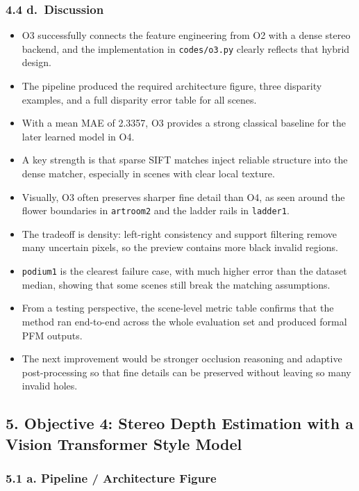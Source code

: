 \documentclass[
  11pt,
]{article}
\providecommand{\tightlist}{%
  \setlength{\itemsep}{0pt}\setlength{\parskip}{0pt}}
\begin{document}
\subsubsection{4.4 d.~Discussion}\label{d.-discussion-2}

\begin{itemize}
\tightlist
\item
  O3 successfully connects the feature engineering from O2 with a dense
  stereo backend, and the implementation in \texttt{codes/o3.py} clearly
  reflects that hybrid design.
\item
  The pipeline produced the required architecture figure, three
  disparity examples, and a full disparity error table for all scenes.
\item
  With a mean MAE of 2.3357, O3 provides a strong classical baseline for
  the later learned model in O4.
\item
  A key strength is that sparse SIFT matches inject reliable structure
  into the dense matcher, especially in scenes with clear local texture.
\item
  Visually, O3 often preserves sharper fine detail than O4, as seen
  around the flower boundaries in \texttt{artroom2} and the ladder rails
  in \texttt{ladder1}.
\item
  The tradeoff is density: left-right consistency and support filtering
  remove many uncertain pixels, so the preview contains more black
  invalid regions.
\item
  \texttt{podium1} is the clearest failure case, with much higher error
  than the dataset median, showing that some scenes still break the
  matching assumptions.
\item
  From a testing perspective, the scene-level metric table confirms that
  the method ran end-to-end across the whole evaluation set and produced
  formal PFM outputs.
\item
  The next improvement would be stronger occlusion reasoning and
  adaptive post-processing so that fine details can be preserved without
  leaving so many invalid holes.
\end{itemize}

\subsection{5. Objective 4: Stereo Depth Estimation with a Vision
Transformer Style
Model}\label{objective-4-stereo-depth-estimation-with-a-vision-transformer-style-model}

\subsubsection{5.1 a. Pipeline / Architecture
Figure}\label{a.-pipeline-architecture-figure}
\end{document}
